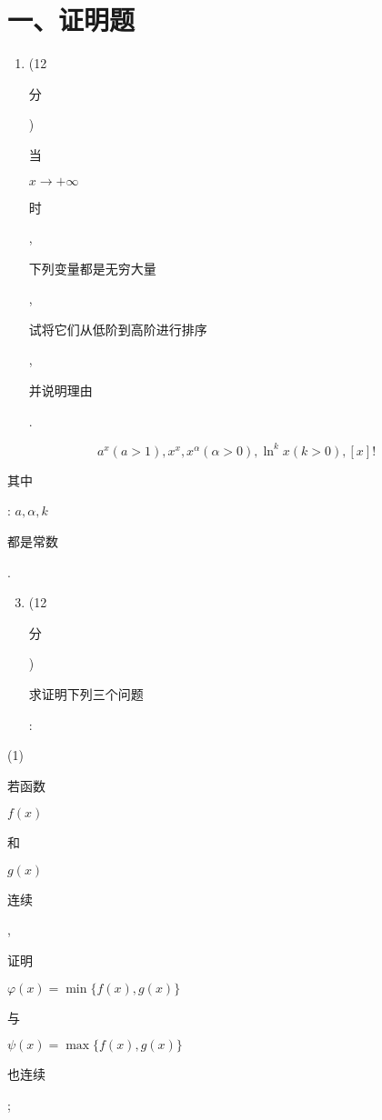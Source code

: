 \documentclass[10pt]{article}
\begin{document}
\section{一、证明题}
\begin{enumerate}
  \item (12 \begin{CJK}{UTF8}{mj}分\end{CJK}) \begin{CJK}{UTF8}{mj}当\end{CJK} $x \rightarrow+\infty$ \begin{CJK}{UTF8}{mj}时\end{CJK}, \begin{CJK}{UTF8}{mj}下列变量都是无穷大量\end{CJK}, \begin{CJK}{UTF8}{mj}试将它们从低阶到高阶进行排序\end{CJK}, \begin{CJK}{UTF8}{mj}并说明理由\end{CJK}.
\end{enumerate}
$$
a^{x}(a>1), x^{x}, x^{\alpha}(\alpha>0), \ln ^{k} x(k>0),[x] !
$$
\begin{CJK}{UTF8}{mj}其中\end{CJK}: $a, \alpha, k$ \begin{CJK}{UTF8}{mj}都是常数\end{CJK}.

\begin{enumerate}
  \setcounter{enumi}{2}
  \item (12 \begin{CJK}{UTF8}{mj}分\end{CJK}) \begin{CJK}{UTF8}{mj}求证明下列三个问题\end{CJK}:
\end{enumerate}
(1) \begin{CJK}{UTF8}{mj}若函数\end{CJK} $f(x)$ \begin{CJK}{UTF8}{mj}和\end{CJK} $g(x)$ \begin{CJK}{UTF8}{mj}连续\end{CJK}, \begin{CJK}{UTF8}{mj}证明\end{CJK} $\varphi(x)=\min \{f(x), g(x)\}$ \begin{CJK}{UTF8}{mj}与\end{CJK} $\psi(x)=\max \{f(x), g(x)\}$ \begin{CJK}{UTF8}{mj}也连续\end{CJK};
\end{document}
